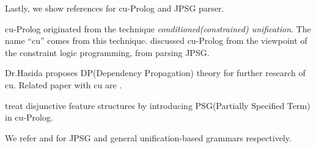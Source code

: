 Lastly, we show references for cu-Prolog and JPSG parser.

cu-Prolog originated from the technique {\em conditioned(constrained)
unification}\cite{cs:cu,has:cu}. The name ``cu'' comes from this
technique.
\cite{tuda:lpc,tuda:sof89} discussed cu-Prolog from the viewpoint of
the constraint logic programming,
\cite{tuda:acl,tuda:sico} from parsing JPSG.

Dr.Hasida proposes DP(Dependency Propagation) theory \cite{has:com} 
for further research of cu. Related paper with cu are
\cite{tuda:sico,has:iwpt}.

\cite{tuda:sof91,tuda:fgcs} treat disjunctive feature structures by
introducing PSG(Partially Specified Term) in cu-Prolog.

We refer \cite{gun:jpsg} and \cite{shi:ub} for JPSG and
general unification-based grammars respectively.




